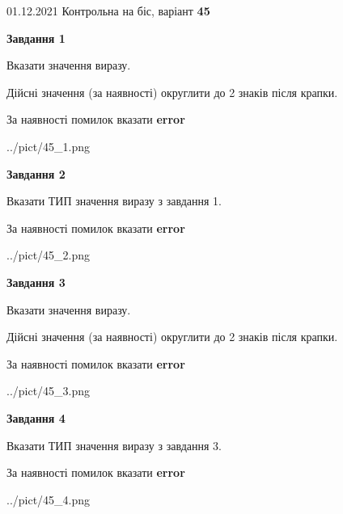 \documentclass[11pt, ukrainian]{article}
\begin{document}
{01.12.2021 Контрольна на біс, варіант  \No \textbf { 45 }\par}
{
\begin {large}
{\begin {center}\textbf{Завдання 1}\end {center}}\par
Вказати значення виразу. \par
Дійсні значення (за наявності) округлити до 2 знаків після крапки. \par
За наявності помилок вказати \textbf{error}

\begin{center}
	{../pict/45_1.png}
\end{center}
\newpage

{\begin {center}\textbf{Завдання 2}\end {center}}\par
Вказати ТИП значення виразу з завдання 1. \par
За наявності помилок вказати \textbf{error}

\begin{center}
	{../pict/45_2.png}
\end{center}
\newpage

{\begin {center}\textbf{Завдання 3}\end {center}}\par
Вказати значення виразу. \par
Дійсні значення (за наявності) округлити до 2 знаків після крапки. \par
За наявності помилок вказати \textbf{error}

\begin{center}
	{../pict/45_3.png}
\end{center}
\newpage

{\begin {center}\textbf{Завдання 4}\end {center}}\par
Вказати ТИП значення виразу з завдання 3. \par
За наявності помилок вказати \textbf{error}

\begin{center}
	{../pict/45_4.png}
\end{center}
\newpage


\end{large}}
\end{document}
